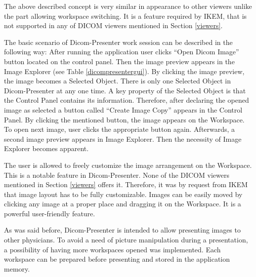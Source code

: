 The above described concept is very similar in appearance to other viewers unlike the part allowing workspace switching. It is a feature required by IKEM, that is not supported in any of DICOM viewers mentioned in Section \ref{viewers}.

The basic scenario of Dicom-Presenter work session can be described in the following way: After running the application user clicks ``Open Dicom Image'' button located on the control panel. Then the image preview appears in the Image Explorer (see Table \ref{dicompresentergui}). By clicking the image preview, the image becomes a Selected Object. There is only one Selected Object in Dicom-Presenter at any one time. A key property of the Selected Object is that the Control Panel contains its information. Therefore, after declaring the opened image as selected a button called ``Create Image Copy'' appears in the Control Panel. By clicking the mentioned button, the image appears on the Workspace. To open next image, user clicks the appropriate button again. Afterwards, a second image preview appears in Image Explorer. Then the necessity of Image Explorer becomes apparent.

The user is allowed to freely customize the image arrangement on the Workspace. This is a notable feature in Dicom-Presenter. None of the DICOM viewers mentioned in Section \ref{viewers} offers it. Therefore, it was by request from IKEM that image layout has to be fully customizable. Images can be easily moved  by clicking any image at a proper place and dragging it on the Workspace.  It is a powerful user-friendly feature.

As was said before, Dicom-Presenter is intended to allow presenting images to other physicians. To avoid a need of picture manipulation during a presentation, a possibility of having more workspaces opened was implemented. Each workspace can be prepared before presenting and stored in the application memory.
 
